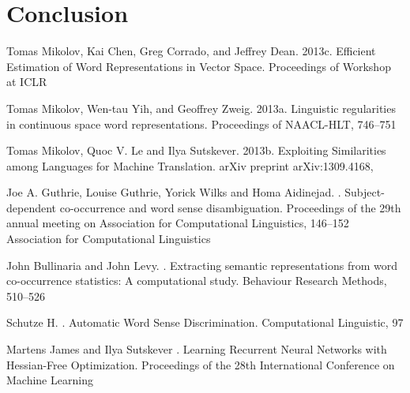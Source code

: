 \documentclass[11pt]{article}
\begin{document}
\section{Conclusion}
\begin{thebibliography}{}

Tomas Mikolov, Kai Chen, Greg Corrado, and Jeffrey Dean.
\newblock 2013c.
\newblock Efficient Estimation of Word Representations in Vector Space.
\newblock Proceedings of Workshop at ICLR

Tomas Mikolov, Wen-tau Yih, and Geoffrey Zweig.
\newblock 2013a.
\newblock Linguistic regularities in continuous space word representations.
\newblock Proceedings of NAACL-HLT, 
746--751

Tomas Mikolov, Quoc V. Le and Ilya Sutskever.
\newblock 2013b.
\newblock Exploiting Similarities among Languages for Machine Translation.
\newblock arXiv preprint arXiv:1309.4168, 

Joe A. Guthrie, Louise Guthrie, Yorick Wilks and Homa Aidinejad.
.
\newblock Subject-dependent co-occurrence and word sense disambiguation.
\newblock Proceedings of the 29th annual meeting on Association for Computational Linguistics, 
146--152
\newblock
Association for Computational Linguistics

John Bullinaria and John Levy.
.
\newblock Extracting semantic representations from word co-occurrence statistics: A computational study.
\newblock Behaviour Research Methods, 
510--526

Schutze H.
.
\newblock Automatic Word Sense Discrimination.
\newblock Computational Linguistic, 
97

Martens James and Ilya Sutskever
.
\newblock Learning Recurrent Neural Networks with Hessian-Free Optimization.
\newblock Proceedings of the 28th International Conference on Machine Learning

\end{thebibliography}
\end{document}

